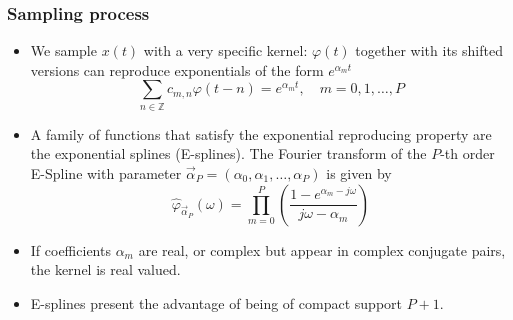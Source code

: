 \documentclass[8pt]{beamer}
\begin{document}
\begin{frame}
\frametitle{Sampling process} 

\begin{itemize}

\item<1-> We sample $x(t)$ with a very specific kernel: $\varphi(t)$ together
with its shifted versions can reproduce exponentials of the form $e^{\alpha_mt}$
\begin{equation*}
\sum_{n \in \mathbb{Z}} c_{m,n} \varphi(t-n) = e^{\alpha_mt}, \quad m = 0, 1, \ldots, P
\end{equation*}

\item<2-> A family of functions that satisfy the exponential reproducing property are the 
exponential splines (E-splines). The Fourier transform of the $P$-th order E-Spline 
with parameter $\vec{\alpha}_P = (\alpha_0, \alpha_1, \ldots, \alpha_P)$ is given by
\begin{equation*}
\hat{\varphi}_{\vec{\alpha}_P}(\omega) 
= 
\prod_{m=0}^P \left( \frac{1-e^{\alpha_m-j\omega}}{j\omega-\alpha_m} \right)
\end{equation*}

\item<3-> If coefficients $\alpha_m$ are real, or complex but appear in complex conjugate
pairs, the kernel is real valued.
\\[.2cm]

\item<3-> E-splines present the advantage of being of compact support $P+1$.

\end{itemize}

\end{frame}
\end{document}
